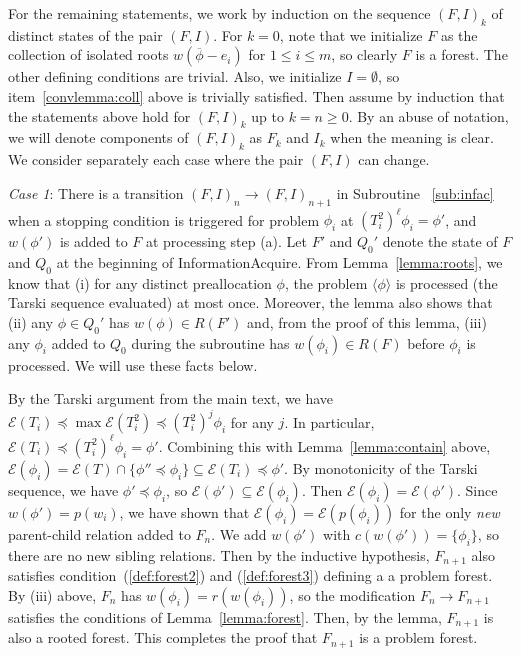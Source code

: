 \documentclass[11pt,reqno]{amsart}
\theoremstyle{definition}
\numberwithin{equation}{section}
\newcommand{\ol}{\overline}
\newcommand{\lag}{\langle}
\newcommand{\rag}{\rangle}
\newcommand{\pre}{\phi}
\newcommand{\sub}{\subseteq}
\newcommand{\fix}{\mathcal{E}}
\newcommand{\peq}{\preceq}
\newcommand{\toppre}{\ol{\pre}}
\newcommand{\acto}{Q_0}
\newcommand{\coll}{I}
\newcommand{\forest}{F}
\newcommand{\pair}{(F,I)}
\newcommand{\roott}{R}
\newcommand{\infacbstopa}{(a)\xspace}
\begin{document}
For the remaining statements, we work by induction on the sequence $\pair_k$ of distinct states of the pair $\pair$. 
For $k = 0$, note that we initialize $F$ as the collection of isolated roots $w(\toppre - e_i)$ for $1 \leq i \leq m$, so clearly $F$ is a forest.
The other defining conditions are trivial.
Also, we initialize $\coll = \emptyset$, so item~\ref{convlemma:coll} above is trivially satisfied. 
Then assume by induction that the statements above hold for $\pair_k$ up to $k = n \geq 0$. 
By an abuse of notation, we will denote components of $\pair_k$ as $\forest_k$ and $\coll_k$ when the meaning is clear.
We consider separately each case where the pair $\pair$ can change.

\emph{Case 1}: There is a transition $\pair_n \to \pair_{n +1}$ in Subroutine ~\ref{sub:infac} when a stopping condition is triggered for problem $\pre_i$ at $(T_i^2)^{\ell}\pre_i = \pre'$, and $w(\pre')$ is added to $\forest$ at processing step \infacbstopa. 
Let $\forest'$ and $\acto'$ denote the state of $\forest$ and $\acto$ at the beginning of InformationAcquire.
From Lemma~\ref{lemma:roots}, we know that (i) for any distinct preallocation $\pre$, the problem $\lag \pre \rag$ is processed (the Tarski sequence evaluated) at most once.
Moreover, the lemma also shows that (ii) any $\pre \in \acto'$ has $w(\pre) \in \roott(\forest')$ and, from the proof of this lemma, (iii) any $\pre_i$ added to $\acto$ during the subroutine has $w(\pre_i) \in \roott(\forest)$ before $\pre_i$ is processed. 
We will use these facts below. 

By the Tarski argument from the main text, we have $\fix(T_i) \peq \max \fix(T_i^2) \peq (T_i^2)^{j}\pre_i$ for any $j$. 
In particular, $\fix(T_i) \peq (T_i^2)^{\ell}\pre_i = \pre'$.
Combining this with Lemma~\ref{lemma:contain} above, $\fix(\pre_i) = \fix(T) \cap \{\pre'' \peq \pre_i\} \sub \fix(T_i) \peq \pre'$. 
By monotonicity of the Tarski sequence, we have $\pre' \peq \pre_i$, so $\fix(\pre') \sub \fix(\pre_i)$. 
Then $\fix(\pre_i) = \fix(\pre')$.
Since $w(\pre') = p(w_i)$, we have shown that $\fix(\pre_i) = \fix(p(\pre_i))$ for the only \emph{new} parent-child relation added to $\forest_n$. 
We add $w(\pre')$ with $c(w(\pre')) = \{\pre_i\}$, so there are no new sibling relations. 
Then by the inductive hypothesis, $\forest_{n+1}$ also satisfies condition~(\ref{def:forest2}) and (\ref{def:forest3}) defining a a problem forest.
By (iii) above, $\forest_n$ has $w(\pre_i) = r(w(\pre_i))$, so the modification $\forest_n \to \forest_{n + 1}$ satisfies the conditions of Lemma~\ref{lemma:forest}.
Then, by the lemma, $\forest_{n + 1}$ is also a rooted forest. 
This completes the proof that $\forest_{n + 1}$ is a problem forest.
\end{document}
